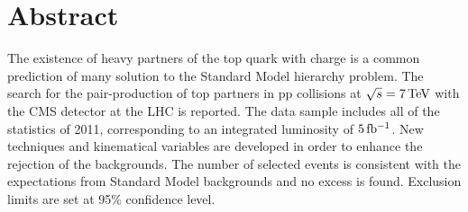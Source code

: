 \begingroup
\let\clearpage\relax
\let\cleardoublepage\relax
\let\cleardoublepage\relax

\chapter*{Abstract}
The existence of heavy partners of the top quark with charge 
is a common prediction of many solution to the Standard Model hierarchy
problem. The search for the pair-production of top partners in $\mathrm{pp}$ collisions at
$\sqrt{s} = \unit[7]{TeV}$ with the CMS detector at the LHC is reported. The
data sample includes all of the statistics of 2011, corresponding to an
integrated luminosity of
$\unit[5]{fb^{-1}}$.
New techniques and kinematical variables are developed in order to enhance
the rejection of the backgrounds.
The number of selected events is consistent with the
expectations from Standard Model backgrounds and no excess is found.
Exclusion limits are set at 95\% confidence level. 





\endgroup			

\vfill
